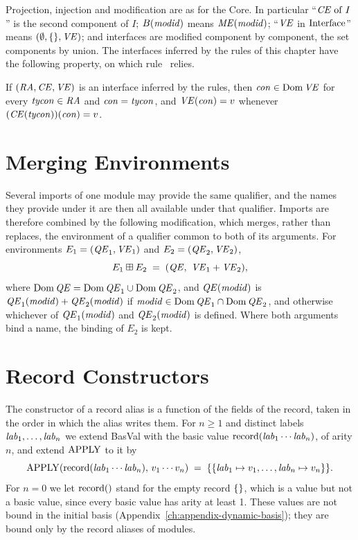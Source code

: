 Projection, injection and modification are as for the Core. In particular
``$\mathit{CE}\mathrel{\mathrm{of}} I$'' is the second component of $I$; $B(\mathit{modid})$ means
$\mathit{ME}(\mathit{modid})$; ``$\mathit{VE}$ in $\mathrm{Interface}$'' means $(\emptyset,\{\},\mathit{VE})$;
and interfaces are modified component by component, the set components by
union. The interfaces inferred by the rules of this chapter have the
following property, on which rule~ relies.
\begin{property}
If $(\mathit{RA},\mathit{CE},\mathit{VE})$ is an interface inferred by the rules, then
$\mathit{con}\in\mathrm{Dom}\,\mathit{VE}$ for every $\mathit{tycon}\in\mathit{RA}$ and $\mathit{con}=\mathit{tycon}$, and
$\mathit{VE}(\mathit{con})=v$ whenever $(\mathit{CE}(\mathit{tycon}))(\mathit{con})=v$.
\end{property}

\section{Merging Environments}\label{sec:dynamic-modules-merge}

Several imports of one module may provide the same qualifier, and the names
they provide under it are then all available under that qualifier. Imports
are therefore combined by the following modification, which merges, rather
than replaces, the environment of a qualifier common to both of its
arguments. For environments $E_1=(\mathit{QE}_1,\mathit{VE}_1)$ and $E_2=(\mathit{QE}_2,\mathit{VE}_2)$,
\[
  E_1\dmmerge E_2 \;=\; (\QE,\ \VE_1+\VE_2),
\]
where $\mathrm{Dom}\,\mathit{QE}=\mathrm{Dom}\,\mathit{QE}_1\cup\mathrm{Dom}\,\mathit{QE}_2$, and $\mathit{QE}(\mathit{modid})$ is
$\mathit{QE}_1(\mathit{modid})+\mathit{QE}_2(\mathit{modid})$ if $\mathit{modid}\in\mathrm{Dom}\,\mathit{QE}_1\cap\mathrm{Dom}\,\mathit{QE}_2$, and
otherwise whichever of $\mathit{QE}_1(\mathit{modid})$ and $\mathit{QE}_2(\mathit{modid})$ is defined.
Where both arguments bind a name, the binding of $E_2$ is kept.

\section{Record Constructors}\label{sec:dynamic-modules-record}

The constructor of a record alias is a function of the fields of the record,
taken in the order in which the alias writes them. For $n\geq 1$ and distinct
labels $\mathit{lab}_1,\ldots,\mathit{lab}_n$ we extend BasVal with the basic value
$\mathrm{record}(\mathit{lab}_1\cdots\mathit{lab}_n)$, of arity $n$, and extend $\mathrm{APPLY}$ to it by
\[
  \mathrm{APPLY}(\mathrm{record}(\mathit{lab}_1\cdots\mathit{lab}_n),\,v_1\cdots v_n)
  \;=\; \{\{\mathit{lab}_1\mapsto v_1,\ldots,\mathit{lab}_n\mapsto v_n\}\}.
\]
For $n=0$ we let $\mathrm{record}()$ stand for the empty record $\{\}$, which
is a value but not a basic value, since every basic value has arity at least
1. These values are not bound in the initial basis
(Appendix~\ref{ch:appendix-dynamic-basis}); they are bound only by the
record aliases of modules.


